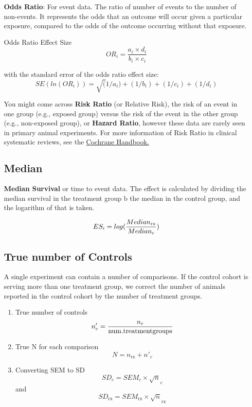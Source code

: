 \documentclass[
]{book}
\begin{document}
\textbf{Odds Ratio}: For event data. The ratio of number of events to the number of non-events. It represents the odds that an outcome will occur given a particular exposure, compared to the odds of the outcome occurring without that exposure.

Odds Ratio Effect Size
\[ OR_i = \frac {a_i \times d_i}{b_i \times c_i}  \]

with the standard error of the odds ratio effect size:
\[ SE(ln(OR_i)) = \sqrt (1/a_i)+(1/b_i)+(1/c_i)+(1/d_i)    \]

You might come across \textbf{Risk Ratio} (or Relative Risk), the risk of an event in one group (e.g., exposed group) versus the risk of the event in the other group (e.g., non-exposed group), or \textbf{Hazard Ratio}, however these data are rarely seen in primary animal experiments. For more information of Risk Ratio in clinical systematic reviews, see the \href{https://handbook-5-1.cochrane.org/chapter_9/box_9_2_a_calculation_of_risk_ratio_rr_odds_ratio_or_and.htm}{Cochrane Handbook.}

\hypertarget{median}{%
\subsection{Median}\label{median}}

\textbf{Median Survival} or time to event data. The effect is calculated by dividing the median survival in the treatment group b the median in the control group, and the logarithm of that is taken.

\[ ES_i = log (\frac{Median_{\rm rx}}{Median_c} ) \]

\hypertarget{true-number-of-controls}{%
\subsection{True number of Controls}\label{true-number-of-controls}}

A single experiment can contain a number of comparisons. If the control cohort is serving more than one treatment group, we correct the number of animals reported in the control cohort by the number of treatment groups.

\begin{enumerate}
\def\labelenumi{(\arabic{enumi})}
\item
  True number of controls
  \[n'_c = \frac{n_c}{{\rm num. treatment groups}}\]
\item
  True N for each comparison
  \[N = n_{\text{rx}} + n'_c\]
\item
  Converting SEM to SD
  \[ SD_c = SEM_c \times \sqrt n_c \] and \[SD_{\text{rx}} = SEM_{\text{rx}} \times \sqrt n_{\text{rx}} \]
\end{enumerate}
\end{document}
